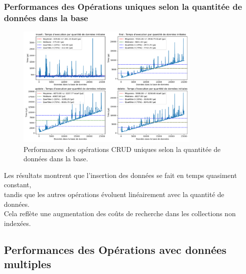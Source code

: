 \documentclass[12pt,a4paper]{report}
\begin{document}
        \subsubsection{Performances des Opérations uniques selon la quantitée de données dans la base}
        \begin{figure}[H]
            \centering
            \includegraphics[width=0.8\textwidth]{../plots/MongoDB/standalone/test_one_various_data.png}
            \caption{Performances des opérations CRUD uniques selon la quantitée de données dans la base.}
            \label{fig:mongo_standalone_one_various}
        \end{figure}

        \begin{card}
            Les résultats montrent que l'insertion des données se fait en temps quasiment constant, \\
            tandis que les autres opérations évoluent linéairement avec la quantité de données.     \\
            Cela  reflète une augmentation des coûts de recherche dans les collections non indexées.\\
        \end{card}

    \subsection{Performances des Opérations avec données multiples}
\end{document}
